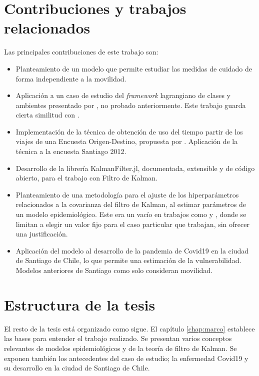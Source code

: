 \begin{intro}
\section*{Contribuciones y trabajos relacionados}

Las principales contribuciones de este trabajo son: 

\begin{itemize}
    \item Planteamiento de un modelo que permite estudiar las medidas de cuidado de forma independiente a la movilidad. 
    \item Aplicación a un caso de estudio del \textit{framework} lagrangiano de clases y ambientes presentado por \cite{Bichara2018}, no probado anteriormente. Este trabajo guarda cierta similitud con \cite{Shikhmurzaev}.
    \item Implementación de la técnica de obtención de uso del tiempo  partir de los viajes de una Encuesta Origen-Destino, propuesta por \cite{Munizaga2011}. Aplicación de la técnica a la encuesta Santiago 2012.
    \item Desarrollo de la librería KalmanFilter.jl, documentada, extensible y de código abierto, para el trabajo con Filtro de Kalman.
    \item Planteamiento de una metodología para el ajuste de los hiperparámetros relacionados a la covarianza del filtro de Kalman, al estimar parámetros de un modelo epidemiológico. Este era un vacío en trabajos como \cite{Hasan2020} y \cite{Sameni2020}, donde se limitan a elegir un valor fijo para el caso particular que trabajan, sin ofrecer una justificación.
    \item Aplicación del modelo al desarrollo de la pandemia de Covid19 en la ciudad de Santiago de Chile, lo que permite una estimación de la vulnerabilidad. Modelos anteriores de Santiago como \cite{Gozzi2021} solo consideran movilidad.
\end{itemize}

\section*{Estructura de la tesis}
El resto de la tesis está organizado como sigue. El capítulo \ref{chap:marco} establece las bases para entender el trabajo realizado. Se presentan varios conceptos relevantes de modelos epidemiológicos y de la teoría de filtro de Kalman. Se exponen también los antecedentes del caso de estudio; la enfermedad Covid19 y su desarrollo en la ciudad de Santiago de Chile.


\end{intro}
